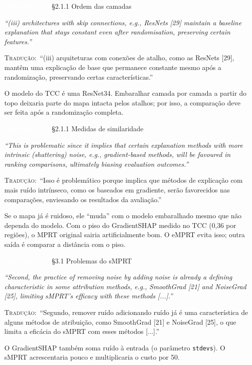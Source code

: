 \documentclass[11pt,a4paper]{article}
\newcommand{\pagechip}[1]{{\setlength{\fboxsep}{1.5pt}\colorbox{cAcc}{\textcolor{white}{\scriptsize\texttt{#1}}}}}
\newenvironment{origquote}{\par\itshape\small}{\par}
\newenvironment{tradquote}{\par\small\textsc{Tradução:}\ }{\par}
\newcommand{\explab}[1]{\par\smallskip{\small\color{cAcc}\textbf{\MakeUppercase{#1}}}\par}
\begin{document}
\begin{citacard}{\pagechip{Hedström p. 3} §2.1.1 Ordem das camadas}
\begin{origquote}“(iii) architectures with skip connections, e.g., ResNets [29] maintain a baseline explanation that stays constant even after randomisation, preserving certain features.”\end{origquote}
\begin{tradquote}“(iii) arquiteturas com conexões de atalho, como as ResNets [29], mantêm uma explicação de base que permanece constante mesmo após a randomização, preservando certas características.”\end{tradquote}
\explab{Explicação}
O modelo do TCC é uma ResNet34. Embaralhar camada por camada a partir do topo deixaria parte do mapa intacta pelos atalhos; por isso, a comparação deve ser feita após a randomização completa.
\end{citacard}

\begin{citacard}{\pagechip{Hedström p. 4} §2.1.1 Medidas de similaridade}
\begin{origquote}“This is problematic since it implies that certain explanation methods with more intrinsic (shattering) noise, e.g., gradient-based methods, will be favoured in ranking comparisons, ultimately biasing evaluation outcomes.”\end{origquote}
\begin{tradquote}“Isso é problemático porque implica que métodos de explicação com mais ruído intrínseco, como os baseados em gradiente, serão favorecidos nas comparações, enviesando os resultados da avaliação.”\end{tradquote}
\explab{Explicação}
Se o mapa já é ruidoso, ele “muda” com o modelo embaralhado mesmo que não dependa do modelo. Com o piso do GradientSHAP medido no TCC (0,36 por regiões), o MPRT original sairia artificialmente bom. O eMPRT evita isso; outra saída é comparar a distância com o piso.
\end{citacard}

\begin{citacard}{\pagechip{Hedström p. 4} §3.1 Problemas do sMPRT}
\begin{origquote}“Second, the practice of removing noise by adding noise is already a defining characteristic in some attribution methods, e.g., SmoothGrad [21] and NoiseGrad [25], limiting sMPRT's efficacy with these methods [...].”\end{origquote}
\begin{tradquote}“Segundo, remover ruído adicionando ruído já é uma característica de alguns métodos de atribuição, como SmoothGrad [21] e NoiseGrad [25], o que limita a eficácia do sMPRT com esses métodos [...].”\end{tradquote}
\explab{Explicação}
O GradientSHAP também soma ruído à entrada (o parâmetro \texttt{stdevs}). O sMPRT acrescentaria pouco e multiplicaria o custo por 50.
\end{citacard}
\end{document}
